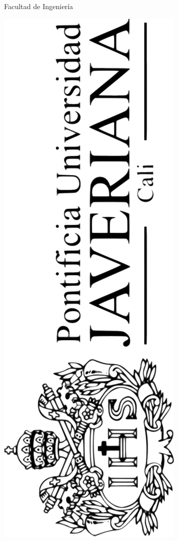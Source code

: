 \begin{center}
{\Large{}Facultad de Ingeniería} 
\par\end{center}

\vfill{}

\newpage{}

\thispagestyle{empty} \vfill{}
\includegraphics[scale=0.2,angle=270]{illustrations/logo/LogoHorizontalNegro}
\\

